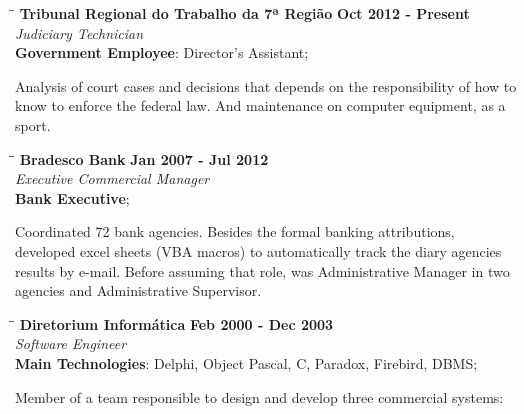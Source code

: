 \documentclass[margin]{res}
\begin{document}
\begin{resume}
   \begin{tabbing}
   \hspace{2.3in}\= \hspace{1.7in}\= \kill %
    \textbf{Tribunal Regional do Trabalho da 7ª Região}    \>\>\textbf{Oct 2012 - Present}\\
    \textit{Judiciary Technician}\\
    \textbf{Government Employee}: Director's Assistant;
   \end{tabbing}\vspace{-20pt}      %
    \vspace{2mm}
    Analysis of court cases and decisions that depends on the responsibility of how to know to enforce the federal law.
    And maintenance on computer equipment, as a sport.

   \begin{tabbing}
   \hspace{2.3in}\= \hspace{1.7in}\= \kill %
    \textbf{Bradesco Bank}    \>\>\textbf{Jan 2007 - Jul 2012}\\
    \textit{Executive Commercial Manager}\\
    \textbf{Bank Executive};
   \end{tabbing}\vspace{-20pt}      %
    \vspace{2mm}
    Coordinated 72 bank agencies. Besides the formal banking attributions, developed excel sheets (VBA macros) to automatically track
    the diary agencies results by e-mail. Before assuming that role, was Administrative Manager in two agencies and Administrative
    Supervisor.

   \begin{tabbing}
   \hspace{2.3in}\= \hspace{1.7in}\= \kill %
    \textbf{Diretorium Informática}    \>\>\textbf{Feb 2000 - Dec 2003}\\
    \textit{Software Engineer}\\
    \textbf{Main Technologies}: Delphi, Object Pascal, C, Paradox, Firebird, DBMS;
   \end{tabbing}\vspace{-20pt}      %
    \vspace{2mm}

    Member of a team responsible to design and develop three commercial systems:


\end{resume}
\end{document}
